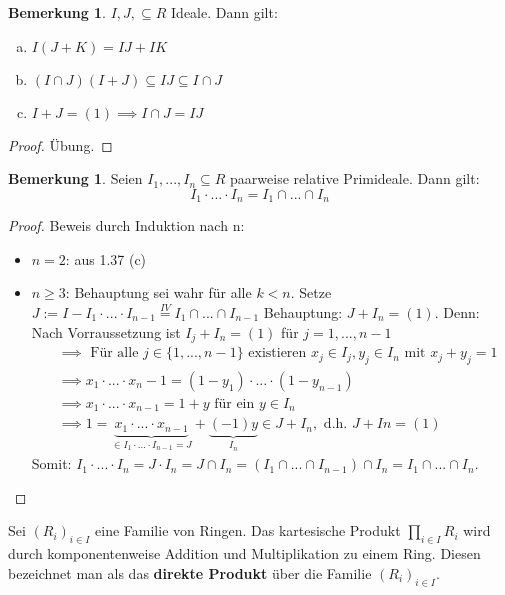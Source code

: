 \documentclass[a4paper, titlepage]{article}
\theoremstyle{definition}
\newtheorem{bem}[satz]{Bemerkung}
\begin{document}
\begin{bem}
    $I,J,\subseteq R$ Ideale. Dann gilt:
    \begin{enumerate}[(a)]
        \item $I(J+K)=IJ+IK$
        \item $(I\cap J)(I+J)\subseteq IJ \subseteq I\cap J$
        \item $I+J=(1)\implies I\cap J = IJ $
    \end{enumerate}
\end{bem}
\begin{proof}
    Übung.
\end{proof}
\begin{bem}
    Seien $I_1,...,I_n\subseteq R$ paarweise relative Primideale. Dann gilt:
    $$I_1\cdot ... \cdot I_n=I_1\cap ... \cap I_n$$
\end{bem}
\begin{proof}
    Beweis durch Induktion nach n:
    \begin{itemize}
        \item $n=2$: aus 1.37 (c)
        \item $n\geq 3$: Behauptung sei wahr für alle $k<n$. Setze $J:=I-I_1\cdot...\cdot I_{n-1}\overset{IV}{=}I_1\cap...\cap I_{n-1}$
        Behauptung: $J+I_{n}=(1)$. Denn: Nach Vorraussetzung ist $I_{j}+I_n=(1)$ für $j=1,...,n-1$
        \begin{align*}
            &\implies \text{ Für alle } j\in \{1,...,n-1\} \text{ existieren } x_j\in I_j,y_j\in I_n \text{ mit } x_j+y_j=1\\
            &\implies x_1\cdot ... \cdot x_n-1 = (1-y_1)\cdot ... \cdot (1-y_{n-1})\\
            &\implies x_1\cdot ... \cdot x_{n-1} = 1+ y \text{ für ein } y \in I_n\\
            &\implies 1 = \underbrace{x_1\cdot ... \cdot x_{n-1}}_{\in I_1\cdot...\cdot I_{n-1}=J}+\underbrace{(-1)y}_{I_n}\in J+I_n, \text{ d.h. } J+In = (1)
        \end{align*}
        Somit: $I_1\cdot ... \cdot I_n = J \cdot I_n =J\cap I_n = (I_1\cap ... \cap I_{n-1})\cap I_n=I_1\cap ... \cap I_n.$
    \end{itemize}
    \end{proof}
\begin{definition}
    Sei $(R_i)_{i\in I}$ eine Familie von Ringen. Das kartesische Produkt $\prod_{i\in I}R_i$ wird durch komponentenweise Addition und Multiplikation zu einem Ring. Diesen bezeichnet man als das \textbf{direkte Produkt} über die Familie $(R_i)_{i\in I}.$
\end{definition} 
\end{document}
